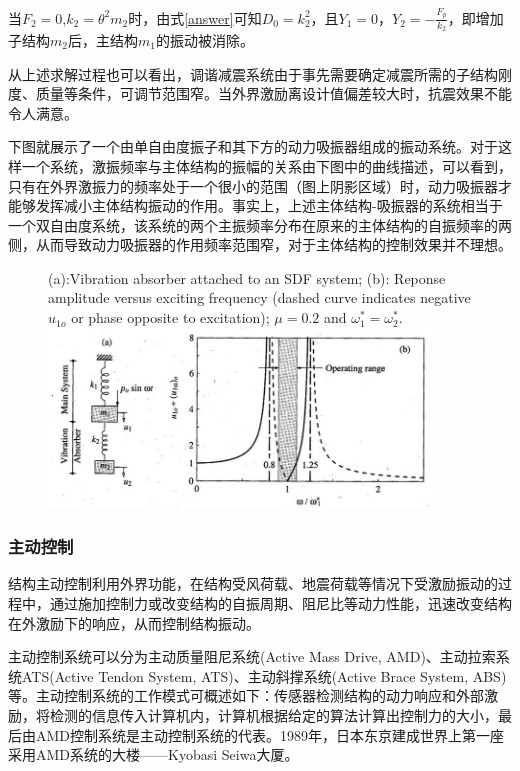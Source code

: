 \begin{enumerate}
	当$F_2=0$,$k_2=\theta^2m_2$时，由式\eqref{answer}可知$D_0=k_2^2$，且$Y_1=0$，$Y_2=-\frac{F_p}{k_2}$，即增加子结构$m_2$后，主结构$m_1$的振动被消除。
	
	从上述求解过程也可以看出，调谐减震系统由于事先需要确定减震所需的子结构刚度、质量等条件，可调节范围窄。当外界激励离设计值偏差较大时，抗震效果不能令人满意。
	
	下图就展示了一个由单自由度振子和其下方的动力吸振器组成的振动系统。对于这样一个系统，激振频率与主体结构的振幅的关系由下图中的曲线描述，可以看到，只有在外界激振力的频率处于一个很小的范围（图上阴影区域）时，动力吸振器才能够发挥减小主体结构振动的作用。事实上，上述主体结构-吸振器的系统相当于一个双自由度系统，该系统的两个主振频率分布在原来的主体结构的自振频率的两侧，从而导致动力吸振器的作用频率范围窄，对于主体结构的控制效果并不理想\cite{chopra2007}。
	
	\begin{figure}[H]
		\centering
		{(a):Vibration absorber attached to an SDF system; (b): Reponse amplitude versus exciting frequency (dashed curve indicates negative $u_{1o}$ or phase opposite to excitation); $\mu=0.2$ and $\omega_1^*=\omega_2^*$.}
		\label{double}
		\includegraphics[width=4in]{figure/double}
	\end{figure}
	
\end{enumerate}


\subsubsection{主动控制}
结构主动控制利用外界功能，在结构受风荷载、地震荷载等情况下受激励振动的过程中，通过施加控制力或改变结构的自振周期、阻尼比等动力性能，迅速改变结构在外激励下的响应，从而控制结构振动。

主动控制系统可以分为主动质量阻尼系统(Active Mass Drive, AMD)、主动拉索系统ATS(Active Tendon System, ATS)、主动斜撑系统(Active Brace System, ABS)等。主动控制系统的工作模式可概述如下：传感器检测结构的动力响应和外部激励，将检测的信息传入计算机内，计算机根据给定的算法计算出控制力的大小，最后由AMD控制系统是主动控制系统的代表。1989年，日本东京建成世界上第一座采用AMD系统的大楼——Kyobasi Seiwa大厦\cite{T.KoboriN.KoshikaN.Yamada1991}。


